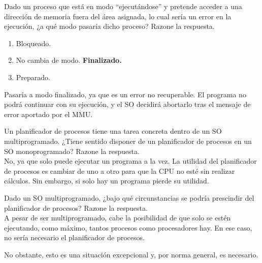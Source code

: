 \begin{ejercicio}\label{ej:2.Ejercicio4}
    Dado un proceso que está en modo “ejecutándose” y pretende acceder a una dirección de memoria fuera del área asignada, lo cual sería un error en la ejecución, ¿a qué modo pasaría dicho proceso? Razone la respuesta.
    \begin{enumerate}[label=(\alph*)]
      \item Bloqueado.
      \item No cambia de modo.
      \myitem \textbf{Finalizado.}
      \item Preparado.
    \end{enumerate}

    Pasaría a modo finalizado, ya que es un error no recuperable. El programa no podrá continuar con su ejecución, y el SO decidirá abortarlo tras el mensaje de error aportado por el MMU.
\end{ejercicio}

\begin{ejercicio}\label{ej:2.Ejercicio5}
    Un planificador de procesos tiene una tarea concreta dentro de un SO multiprogramado. ¿Tiene sentido disponer de un planificador de procesos en un SO monoprogramado? Razone la respuesta.\\

    No, ya que solo puede ejecutar un programa a la vez. La utilidad del planificador de procesos es cambiar de uno a otro para que la CPU no esté sin realizar cálculos. Sin embargo, si solo hay un programa pierde su utilidad.
\end{ejercicio}

\begin{ejercicio}\label{ej:2.Ejercicio6}
    Dado un SO multiprogramado, ¿bajo qué circunstancias se podría prescindir del planificador de procesos? Razone la respuesta.\\

    A pesar de ser multiprogramado, cabe la posibilidad de que solo se estén ejecutando, como máximo, tantos procesos como procesadores hay. En ese caso, no sería necesario el planificador de procesos.

    No obstante, esto es una situación excepcional y, por norma general, es necesario.
\end{ejercicio}

